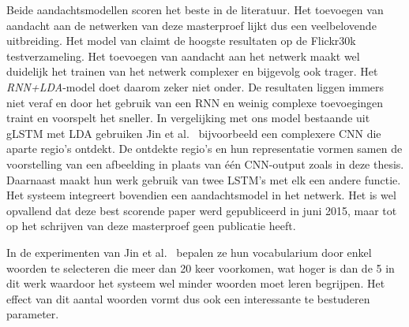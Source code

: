 Beide aandachtsmodellen scoren het beste in de literatuur. Het toevoegen van aandacht aan de netwerken van deze masterproef lijkt dus een veelbelovende uitbreiding.
Het model van \cite{Jin2015} claimt de hoogste resultaten op de Flickr30k testverzameling.
Het toevoegen van aandacht aan het netwerk maakt wel duidelijk het trainen van het netwerk complexer en bijgevolg ook trager.
Het \emph{RNN+LDA}-model doet daarom zeker niet onder. De resultaten liggen immers niet veraf en door het gebruik van een RNN en weinig complexe toevoegingen traint en voorspelt het sneller.
In vergelijking met ons model bestaande uit gLSTM met LDA gebruiken Jin et al.~\cite{Jin2015} bijvoorbeeld een complexere CNN die aparte regio's ontdekt. De ontdekte regio's en hun representatie vormen samen de voorstelling van een afbeelding in plaats van \'e\'en CNN-output zoals in deze thesis. Daarnaast maakt hun werk gebruik van twee LSTM's met elk een andere functie. Het systeem integreert bovendien een aandachtsmodel in het netwerk.
Het is wel opvallend dat deze best scorende paper werd gepubliceerd in juni 2015, maar tot op het schrijven van deze masterproef geen publicatie heeft.

In de experimenten van Jin et al.~\cite{Jin2015} bepalen ze hun vocabularium door enkel woorden te selecteren die meer dan 20 keer voorkomen, wat hoger is dan de 5 in dit werk waardoor het systeem wel minder woorden moet leren begrijpen. Het effect van dit aantal woorden vormt dus ook een interessante te bestuderen parameter.

